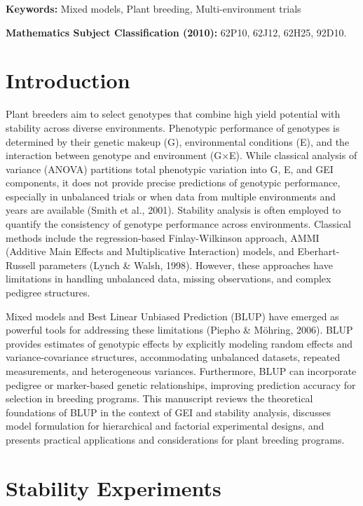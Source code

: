\documentclass[
]{article}
\begin{document}
\textbf{Keywords:} Mixed models, Plant breeding, Multi-environment
trials

\textbf{Mathematics Subject Classification (2010):} 62P10, 62J12, 62H25,
92D10.

\hypertarget{introduction}{%
\section{Introduction}\label{introduction}}

Plant breeders aim to select genotypes that combine high yield potential
with stability across diverse environments. Phenotypic performance of
genotypes is determined by their genetic makeup (G), environmental
conditions (E), and the interaction between genotype and environment
(G×E). While classical analysis of variance (ANOVA) partitions total
phenotypic variation into G, E, and GEI components, it does not provide
precise predictions of genotypic performance, especially in unbalanced
trials or when data from multiple environments and years are available
(Smith et al., 2001). Stability analysis is often employed to quantify
the consistency of genotype performance across environments. Classical
methods include the regression-based Finlay-Wilkinson approach, AMMI
(Additive Main Effects and Multiplicative Interaction) models, and
Eberhart-Russell parameters (Lynch \& Walsh, 1998). However, these
approaches have limitations in handling unbalanced data, missing
observations, and complex pedigree structures.

Mixed models and Best Linear Unbiased Prediction (BLUP) have emerged as
powerful tools for addressing these limitations (Piepho \& Möhring,
2006). BLUP provides estimates of genotypic effects by explicitly
modeling random effects and variance-covariance structures,
accommodating unbalanced datasets, repeated measurements, and
heterogeneous variances. Furthermore, BLUP can incorporate pedigree or
marker-based genetic relationships, improving prediction accuracy for
selection in breeding programs. This manuscript reviews the theoretical
foundations of BLUP in the context of GEI and stability analysis,
discusses model formulation for hierarchical and factorial experimental
designs, and presents practical applications and considerations for
plant breeding programs.

\hypertarget{stability-experiments}{%
\section{Stability Experiments}\label{stability-experiments}}
\end{document}
